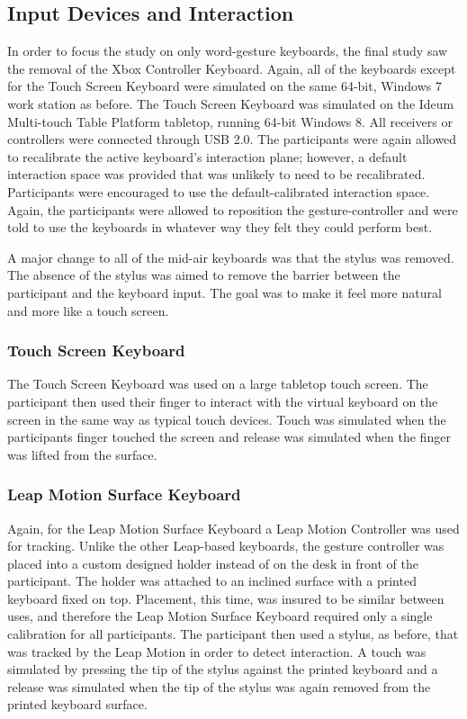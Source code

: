 \subsection{Input Devices and Interaction} \label{final_devices}
In order to focus the study on only word-gesture keyboards, the final study saw the removal of the Xbox Controller Keyboard. Again, all of the keyboards except for the Touch Screen Keyboard were simulated on the same 64-bit, Windows 7 work station as before. The Touch Screen Keyboard was simulated on the Ideum Multi-touch Table Platform tabletop, running 64-bit Windows 8. All receivers or controllers were connected through USB 2.0. The participants were again allowed  to recalibrate the active keyboard's interaction plane; however, a default interaction space was provided that was unlikely to need to be recalibrated. Participants were encouraged to use the default-calibrated interaction space. Again, the participants were allowed to reposition the gesture-controller and were told to use the keyboards in whatever way they felt they could perform best.

A major change to all of the mid-air keyboards was that the stylus was removed. The absence of the stylus was aimed to remove the barrier between the participant and the keyboard input. The goal was to make it feel more natural and more like a touch screen.

\subsubsection{Touch Screen Keyboard}
The Touch Screen Keyboard was used on a large tabletop touch screen. The participant then used their finger to interact with the virtual keyboard on the screen in the same way as typical touch devices. Touch was simulated when the participants finger touched the screen and release was simulated when the finger was lifted from the surface.

\subsubsection{Leap Motion Surface Keyboard}
Again, for the Leap Motion Surface Keyboard a Leap Motion Controller was used for tracking. Unlike the other Leap-based keyboards, the gesture controller was placed into a custom designed holder instead of on the desk in front of the participant. The holder was attached to an inclined surface with a printed keyboard fixed on top. Placement, this time, was insured to be similar between uses, and therefore the Leap Motion Surface Keyboard required only a single calibration for all participants. The participant then used a stylus, as before, that was tracked by the Leap Motion in order to detect interaction. A touch was simulated by pressing the tip of the stylus against the printed keyboard and a release was simulated when the tip of the stylus was again removed from the printed keyboard surface.

